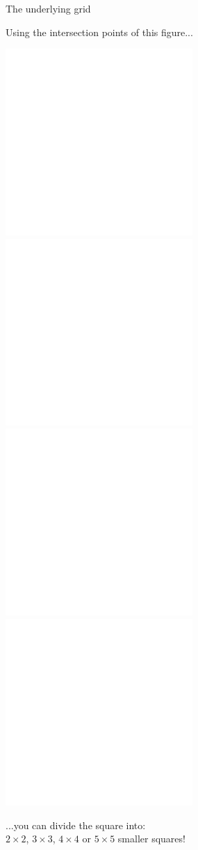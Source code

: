 \documentclass[14pt]{beamer}
\begin{document}
    \begin{frame}{The underlying grid}
        \begin{center}
            Using the intersection points of this figure...

            \bigskip \bigskip

            \includegraphics[height=10ex]{figures/figure002e.pdf}\quad\includegraphics[height=10ex]{figures/figure002f.pdf}\quad\includegraphics[height=10ex]{figures/figure002g.pdf}\quad\includegraphics[height=10ex]{figures/figure002h.pdf}\\

            \bigskip \bigskip

            ...you can divide the square into: \\\medskip$2\!\times\!2$, $3\!\times\!3$, $4\!\times\!4$ or $5\!\times\!5$ smaller squares!
        \end{center}
    \end{frame}

\end{document}
